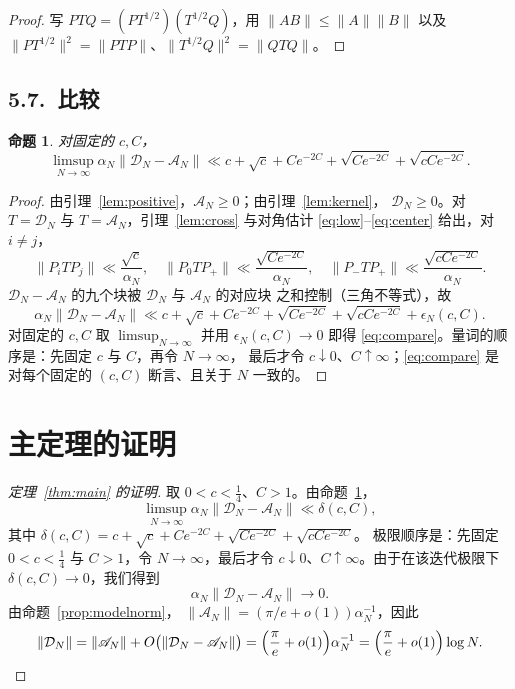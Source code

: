 \documentclass[12pt,a4paper]{amsart}
\numberwithin{equation}{section}
\theoremstyle{plain}
\newtheorem{proposition}[theorem]{命题}
\theoremstyle{definition}
\begin{document}
\begin{proof}
写 $PTQ=(P T^{1/2})(T^{1/2}Q)$，用 $\|AB\|\le\|A\|\|B\|$ 以及
$\|PT^{1/2}\|^2=\|PTP\|$、$\|T^{1/2}Q\|^2=\|QTQ\|$。
\end{proof}

\subsection*{5.7.\ 比较}

\begin{proposition}\label{prop:compare}
对固定的 $c,C$，
\begin{equation}\label{eq:compare}
 \limsup_{N\to\infty}\alpha_N\|\mathcal D_N-\mathscr A_N\|
 \ll c+\sqrt c+Ce^{-2C}+\sqrt{Ce^{-2C}}+\sqrt{cCe^{-2C}} .
\end{equation}
\end{proposition}

\begin{proof}
由引理~\ref{lem:positive}，$\mathscr A_N\ge0$；由引理~\ref{lem:kernel}，
$\mathcal D_N\ge0$。对 $T=\mathcal D_N$ 与 $T=\mathscr A_N$，引理~\ref{lem:cross}
与对角估计 \eqref{eq:low}--\eqref{eq:center} 给出，对 $i\ne j$，
\[
 \|P_iTP_j\|\ll\frac{\sqrt{c}}{\alpha_N},\quad
 \|P_0TP_+\|\ll\frac{\sqrt{Ce^{-2C}}}{\alpha_N},\quad
 \|P_-TP_+\|\ll\frac{\sqrt{cCe^{-2C}}}{\alpha_N} .
\]
$\mathcal D_N-\mathscr A_N$ 的九个块被 $\mathcal D_N$ 与 $\mathscr A_N$ 的对应块
之和控制（三角不等式），故
\[
 \alpha_N\|\mathcal D_N-\mathscr A_N\|
 \ll c+\sqrt c+Ce^{-2C}+\sqrt{Ce^{-2C}}+\sqrt{cCe^{-2C}}+\epsilon_N(c,C).
\]
对固定的 $c,C$ 取 $\limsup_{N\to\infty}$ 并用 $\epsilon_N(c,C)\to0$ 即得
\eqref{eq:compare}。量词的顺序是：先固定 $c$ 与 $C$，再令 $N\to\infty$，
最后才令 $c\downarrow0$、$C\uparrow\infty$；\eqref{eq:compare} 是对每个固定的
$(c,C)$ 断言、且关于 $N$ 一致的。
\end{proof}

\section{主定理的证明}\label{sec:proof}

\begin{proof}[定理~\ref{thm:main} 的证明]
取 $0<c<\frac14$、$C>1$。由命题~\ref{prop:compare}，
\[
 \limsup_{N\to\infty}\alpha_N\|\mathcal D_N-\mathscr A_N\|\ll\delta(c,C),
\]
其中 $\delta(c,C)=c+\sqrt c+Ce^{-2C}+\sqrt{Ce^{-2C}}+\sqrt{cCe^{-2C}}$。
极限顺序是：先固定 $0<c<\frac14$ 与 $C>1$，令 $N\to\infty$，最后才令
$c\downarrow0$、$C\uparrow\infty$。由于在该迭代极限下 $\delta(c,C)\to0$，我们得到
\[
 \alpha_N\|\mathcal D_N-\mathscr A_N\|\longrightarrow0 .
\]
由命题~\ref{prop:modelnorm}，
$\|\mathscr A_N\|=(\pi/e+o(1))\alpha_N^{-1}$，因此
\[
 \|\mathcal D_N\|=\|\mathscr A_N\|+O\bigl(\|\mathcal D_N-\mathscr A_N\|\bigr)
 =\Bigl(\frac{\pi}{e}+o(1)\Bigr)\alpha_N^{-1}
 =\Bigl(\frac{\pi}{e}+o(1)\Bigr)\log N .
\]
\end{proof}
\end{document}
